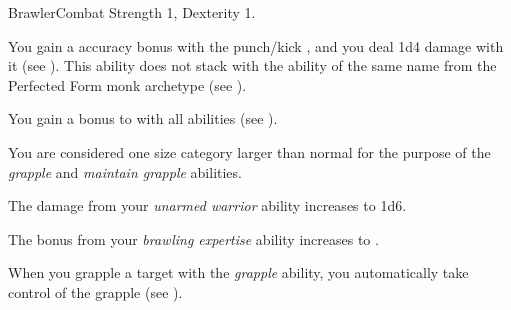   \begin{feat}{Brawler}{Combat}
    \featpre Strength 1, Dexterity 1.

     You gain a  accuracy bonus with the punch/kick , and you deal 1d4 damage with it (see ).
    This ability does not stack with the ability of the same name from the Perfected Form monk archetype (see ).

     You gain a  bonus to  with all  abilities (see ).

     You are considered one size category larger than normal for the purpose of the \textit{grapple} and \textit{maintain grapple} abilities.

     The damage from your \textit{unarmed warrior} ability increases to 1d6.

     The bonus from your \textit{brawling expertise} ability increases to .

     When you grapple a target with the \textit{grapple} ability, you automatically take control of the grapple (see ).
  \end{feat}

